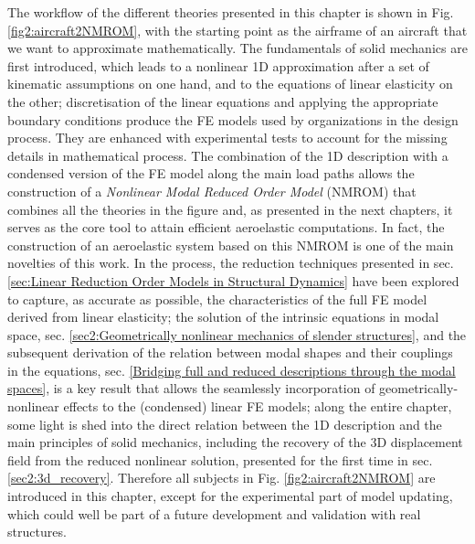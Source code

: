\documentclass[11pt]{article}
\begin{document}
The workflow of the different theories presented in this chapter is shown in Fig. \ref{fig2:aircraft2NMROM}, with the starting point as the  airframe of an aircraft that we want to approximate mathematically. The fundamentals of solid mechanics are first introduced, which leads to a  nonlinear 1D approximation after a set of kinematic assumptions on one hand, and to the equations of linear elasticity on the other; discretisation of the linear equations and applying the appropriate boundary conditions produce the FE models used by organizations in the design process. They are enhanced with experimental tests to account for the missing details in mathematical process. The combination of the 1D description with a condensed version of the FE model along the main load paths allows the construction of a \emph{Nonlinear Modal Reduced Order Model} (NMROM) that combines all the theories in the figure and, as presented in the next chapters, it  serves as the core tool to attain efficient aeroelastic computations. In fact, the construction of an aeroelastic system based on this NMROM is one of the main novelties of this work. In the process, the reduction techniques presented in sec. \ref{sec:Linear Reduction Order Models in Structural Dynamics} have been explored to capture, as accurate as possible, the characteristics of the full FE model derived from linear elasticity; the solution of the intrinsic equations in modal space, sec. \ref{sec2:Geometrically nonlinear mechanics of slender structures}, and  the subsequent derivation of the relation between modal shapes and their couplings in the equations, sec. \ref{Bridging full and reduced descriptions through the modal spaces},  is a key result that allows the seamlessly incorporation of geometrically-nonlinear effects to the (condensed) linear FE models;  along the entire chapter, some light is shed into the direct relation between the 1D description and the main principles of solid mechanics, including the recovery of the 3D displacement field from the reduced nonlinear solution, presented for the first  time in sec. \ref{sec2:3d_recovery}. Therefore all subjects in Fig. \ref{fig2:aircraft2NMROM} are introduced in this chapter, except for the experimental part of model updating, which could well be part of a future development and validation with real structures. 
%
\end{document}
